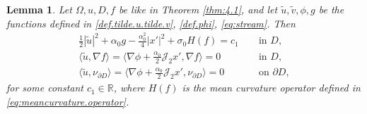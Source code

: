 \documentclass[10pt,reqno,a4paper]{article}
\numberwithin{equation}{section}
\theoremstyle{plain}
\newtheorem{lemma}[theorem]{Lemma}
\theoremstyle{definition}
\newcommand{\R}{{\mathbb R}}
\newcommand{\mJ}{\mathcal{J}}
\newcommand{\la}{\langle}
\newcommand{\ra}{\rangle}
\newcommand{\pa}{\partial}
\begin{document}
\begin{lemma} \label{lem:craig.sulem} 
Let $\Omega, u, D, f$ be like in Theorem \ref{thm:4.1}, 
and let $\tilde u, \tilde v, \phi,g$ be the functions defined in 
\eqref{def.tilde.u.tilde.v}, \eqref{def.phi}, \eqref{eq:stream}.  
Then
\begin{align} 
\frac12 |\tilde u|^2 + \alpha_0 g - \frac{\alpha_0^2}{4} |x'|^2 + \sigma_0  H(f) = c_1 
& \quad \ \text{in } D,
\label{eq:first.reduction.i}
\\
\langle \tilde u, \nabla f \rangle  
= \langle \nabla \phi  +\frac{\alpha_0}{2}\mJ_2 x', \nabla f\rangle=0  
& \quad \ \text{in } D,
\label{eq:first.reduction.ii}
\\
\la \tilde u, \nu_{\pa D} \ra 
= \la \nabla \phi +\frac{\alpha_0}{2} \mJ_2 x', \nu_{\pa D} \ra=0 
& \quad \ \text{on } \pa D,
\label{eq:first.reduction.iii}
\end{align}
for some constant $c_1\in \R$, 
where $H(f)$ is the mean curvature operator 
defined in \eqref{eq:meancurvature.operator}. 
\end{lemma}
\end{document}
